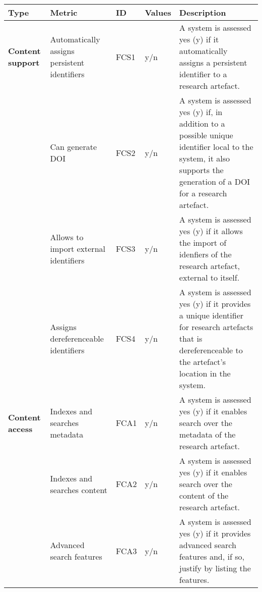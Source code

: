 \begin{tabular}
\end{tabular}


\begin{tabular}{|m{2.5cm}|m{3cm}|m{1cm}|m{1cm}|p{8cm}|}
\hline \textbf{Type}&\textbf{Metric}&\textbf{ID}&\textbf{Values}&\textbf{Description}\\ \hline
\textbf{Content support}&Automatically assigns persistent identifiers&FCS1&y/n&A system is assessed yes (y) if it automatically assigns a persistent identifier to a research artefact.\\ \hline
\textbf{}&Can generate DOI&FCS2&y/n&A system is assessed yes (y) if, in addition to a possible unique identifier local to the system, it also supports the generation of a DOI for a research artefact.\\ \hline
\textbf{}&Allows to import external identifiers&FCS3&y/n&A system is assessed yes (y) if it allows the import of idenfiers of the research artefact, external to itself.\\ \hline
\textbf{}&Assigns dereferenceable identifiers&FCS4&y/n&A system is assessed yes (y) if it provides a unique identifier for research artefacts that is dereferenceable to the artefact's location in the system.\\ \hline
\textbf{Content access}&Indexes and searches metadata&FCA1&y/n&A system is assessed yes (y) if it enables search over the metadata of the research artefact.\\ \hline
\textbf{}&Indexes and searches content&FCA2&y/n&A system is assessed yes (y) if it enables search over the content of the research artefact.\\ \hline
\textbf{}&Advanced search features&FCA3&y/n&A system is assessed yes (y) if it provides advanced search features and, if so, justify by listing the features.\\ \hline
\end{tabular}


